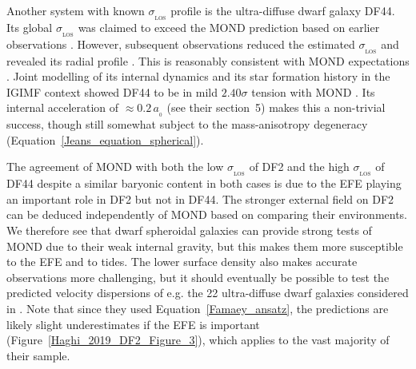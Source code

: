 \documentclass[fleqn,usenatbib,useAMS]{mnras} %
\begin{document}
Another system with known $\sigma_{_\text{LOS}}$ profile is the ultra-diffuse dwarf galaxy DF44. Its global $\sigma_{_\text{LOS}}$ was claimed to exceed the MOND prediction \citep{Hodson_2017_UDG} based on earlier observations \citep{Van_Dokkum_2016}. However, subsequent observations reduced the estimated $\sigma_{_\text{LOS}}$ and revealed its radial profile \citep{Van_Dokkum_2019}. This is reasonably consistent with MOND expectations \citep{Bilek_2019}. Joint modelling of its internal dynamics and its star formation history in the IGIMF context showed DF44 to be in mild $2.40\sigma$ tension with MOND \citep{Haghi_2019_DF44}. Its internal acceleration of $\approx 0.2 \, a_{_0}$ (see their section~5) makes this a non-trivial success, though still somewhat subject to the mass-anisotropy degeneracy (Equation~\ref{Jeans_equation_spherical}).

The agreement of MOND with both the low $\sigma_{_\text{LOS}}$ of DF2 and the high $\sigma_{_\text{LOS}}$ of DF44 despite a similar baryonic content in both cases is due to the EFE playing an important role in DF2 but not in DF44. The stronger external field on DF2 can be deduced independently of MOND based on comparing their environments. We therefore see that dwarf spheroidal galaxies can provide strong tests of MOND due to their weak internal gravity, but this makes them more susceptible to the EFE and to tides. The lower surface density also makes accurate observations more challenging, but it should eventually be possible to test the predicted velocity dispersions of e.g. the 22 ultra-diffuse dwarf galaxies considered in \citet{Muller_2019}. Note that since they used Equation~\ref{Famaey_ansatz}, the predictions are likely slight underestimates if the EFE is important (Figure~\ref{Haghi_2019_DF2_Figure_3}), which applies to the vast majority of their sample.
\end{document}

